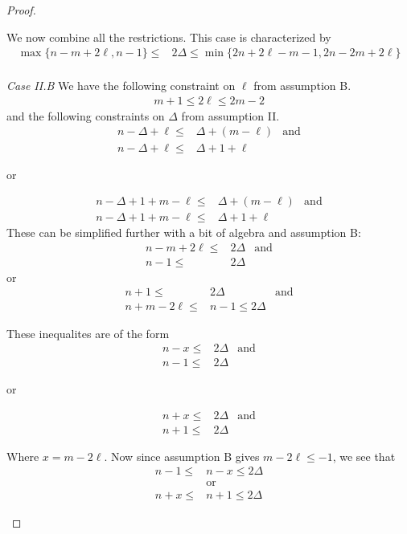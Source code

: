 \documentclass[letterpaper, 10pt]{article}
\begin{document}
\begin{proof}
\begin{proofpart}
We now combine all the restrictions. This case is characterized by
\begin{align*}
  \max\{ n -m + 2\ell, n-1 \} \leq & 2 \Delta \leq \min\{2n + 2\ell - m - 1, 2n - 2m + 2\ell \} \\
\end{align*}

\textit{Case II.B}  We have the following constraint on $\ell$ from
assumption B.
\begin{align*}
  m + 1 \leq 2 \ell \leq 2m - 2
\end{align*}
and the following constraints on $\Delta$ from assumption II.
\begin{align*}
  n - \Delta + \ell \leq & \Delta + (m - \ell) & \text{and} \\
  n - \Delta + \ell \leq & \Delta + 1 + \ell
\end{align*}
\begin{center}or\end{center}
\begin{align*}
n - \Delta + 1 + m - \ell \leq & \Delta + (m - \ell) & \text{and} \\
 n - \Delta + 1 + m - \ell \leq & \Delta + 1 + \ell
\end{align*}
These can be simplified further with a bit of algebra and assumption B:
\begin{align*}
n-m+2\ell \leq & 2 \Delta & \text{and} \\
n-1 \leq & 2\Delta
\end{align*}
or
\begin{align*}
n+1 \leq & 2 \Delta & \text{and} \\
n+m-2\ell  \leq & n-1 \leq 2 \Delta
\end{align*}

These inequalites are of the form
\begin{align*}
  n-x \leq & 2 \Delta & \text{and} \\
  n-1 \leq & 2\Delta
\end{align*}
\begin{center}or\end{center}
\begin{align*}
n + x \leq & 2 \Delta & \text{and} \\
n + 1 \leq & 2 \Delta
\end{align*}

Where $x = m -2\ell$. Now since assumption B gives $m - 2\ell \leq -1$, we
see that
\begin{align*}
  n-1 \leq & n-x \leq 2 \Delta \\
  &\text{or} \\
  n+x \leq & n+1 \leq 2 \Delta
\end{align*}


\end{proofpart}
\end{proof}
\end{document}
